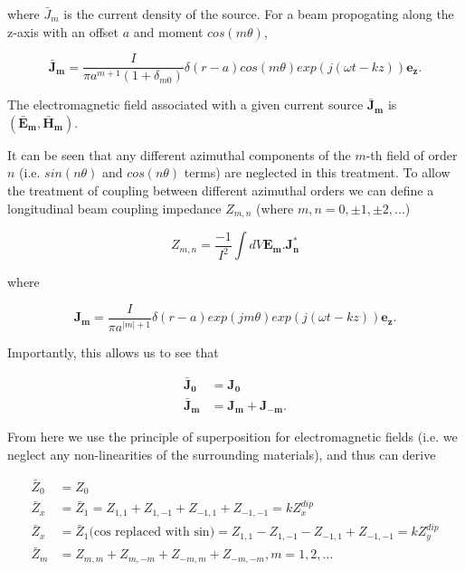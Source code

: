 where $\bar{J}_{m}$ is the current density of the source. For a beam propogating along the z-axis with an offset $a$ and moment $cos \left( m \theta \right)$,

\begin{equation}
\mathbf{\bar{J}_{m}} = \frac{I}{\pi a^{m +1} \left( 1 + \delta_{m0} \right)} \delta \left( r - a \right) cos \left( m \theta \right) exp \left( j \left( \omega t - k z  \right) \right) \mathbf{e_{z}}.
\end{equation}

The electromagnetic field associated with a given current source $\mathbf{\bar{J}_{m}}$ is $\left( \mathbf{\bar{E}_{m}}, \mathbf{\bar{H}_{m}} \right)$. 

It can be seen that any different azimuthal components of the $m$-th field of order $n$ (i.e. $sin \left( n\theta \right)$ and $cos \left( n\theta \right)$ terms) are neglected in this treatment. To allow the treatment of coupling between different azimuthal orders we can define a longitudinal beam coupling impedance $Z_{m,n}$ (where $m,n = 0, \pm 1, \pm 2, ... $)

\begin{equation}
Z_{m,n} = \frac{-1}{I^{2}} \int dV \mathbf{E_{m}. J_{n}^{*}}
\end{equation}

where

\begin{equation}
\mathbf{J_{m}} = \frac{I}{\pi a^{|m |+1}} \delta \left( r - a \right) exp \left(j m \theta \right) exp \left( j \left( \omega t - k z  \right) \right) \mathbf{e_{z}}.
\end{equation}

Importantly, this allows us to see that 

\begin{align}
\mathbf{\bar{J}_{0}} &= \mathbf{J_{0}} \nonumber \\
\mathbf{\bar{J}_{m}} &= \mathbf{J_{m}} + \mathbf{J_{-m}}.
\end{align}

From here we use the principle of superposition for electromagnetic fields (i.e. we neglect any non-linearities of the surrounding materials), and thus can derive

\begin{align}
\bar{Z}_{0} &= Z_{0} \\
\bar{Z}_{x} &= \bar{Z}_{1} = Z_{1,1} + Z_{1,-1} + Z_{-1,1} + Z_{-1,-1} = kZ^{dip}_{x}\\
\bar{Z}_{x} &= \bar{Z}_{1} \text{(cos replaced with sin)}= Z_{1,1} - Z_{1,-1} - Z_{-1,1} + Z_{-1,-1} = kZ^{dip}_{y}\\
\bar{Z}_{m} &= Z_{m,m} + Z_{m,-m} + Z_{-m,m} + Z_{-m,-m}, m=1,2,...
\end{align}

